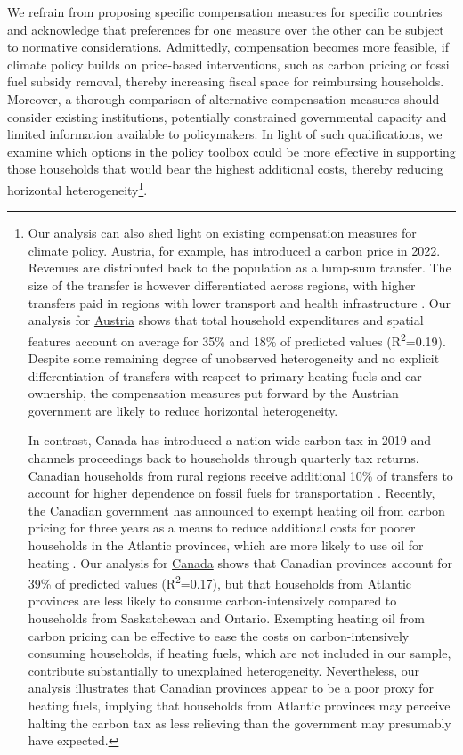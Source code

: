\documentclass[12pt, a4paper]{article}
\begin{document}
We refrain from proposing specific compensation measures for specific countries and acknowledge that preferences for one measure over the other can be subject to normative considerations. Admittedly, compensation becomes more feasible, if climate policy builds on price-based interventions, such as carbon pricing or fossil fuel subsidy removal, thereby increasing fiscal space for reimbursing households. Moreover, a thorough comparison of alternative compensation measures should consider existing institutions, potentially constrained governmental capacity and limited information available to policymakers. In light of such qualifications, we examine which options in the policy toolbox could be more effective in supporting those households that would bear the highest additional costs, thereby reducing horizontal heterogeneity\footnote{Our analysis can also shed light on existing compensation measures for climate policy. Austria, for example, has introduced a carbon price in 2022. Revenues are distributed back to the population as a lump-sum transfer. The size of the transfer is however differentiated across regions, with higher transfers paid in regions with lower transport and health infrastructure \autocite{BMK.2023}. Our analysis for \hyperref[fig:5b_AUT]{Austria} shows that total household expenditures and spatial features account on average for 35\% and 18\% of predicted values (R\textsuperscript{2}=0.19). Despite some remaining degree of unobserved heterogeneity and no explicit differentiation of transfers with respect to primary heating fuels and car ownership, the compensation measures put forward by the Austrian government are likely to reduce horizontal heterogeneity.

In contrast, Canada has introduced a nation-wide carbon tax in 2019 and channels proceedings back to households through quarterly tax returns. Canadian households from rural regions receive additional 10\% of transfers to account for higher dependence on fossil fuels for transportation \autocite{GovernmentofCanada.2023}. Recently, the Canadian government has announced to exempt heating oil from carbon pricing for three years as a means to reduce additional costs for poorer households in the Atlantic provinces, which are more likely to use oil for heating \autocite{Reuters.2023}. Our analysis for \hyperref[fig:5b_CAN]{Canada} shows that Canadian provinces account for 39\% of predicted values (R\textsuperscript{2}=0.17), but that households from Atlantic provinces are less likely to consume carbon-intensively compared to households from Saskatchewan and Ontario. Exempting heating oil from carbon pricing can be effective to ease the costs on carbon-intensively consuming households, if heating fuels, which are not included in our sample, contribute substantially to unexplained heterogeneity. Nevertheless, our analysis illustrates that Canadian provinces appear to be a poor proxy for heating fuels, implying that households from Atlantic provinces may perceive halting the carbon tax as less relieving than the government may presumably have expected.}.
\end{document}
